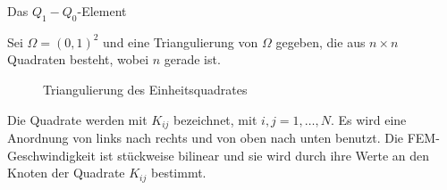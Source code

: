 \begin{beispiel}Das $Q_{1}-Q_{0}$-Element

Sei $\Omega = (0, 1)^{2}$ und eine Triangulierung von $\Omega$ gegeben, die aus $n \times n $ Quadraten besteht, wobei $n$ gerade ist.
\begin{figure}[h!]
  \centering
  \caption{Triangulierung des Einheitsquadrates}
  \label{fig:unit_square}
\end{figure}
Die Quadrate werden mit $K_{ij}$ bezeichnet, mit $i, j = 1, \dots, N$. Es wird eine Anordnung von links nach rechts und von oben nach unten benutzt. Die FEM-Geschwindigkeit ist stückweise bilinear und sie wird durch ihre Werte an den Knoten der Quadrate $K_{ij}$ bestimmt.


\end{beispiel}
